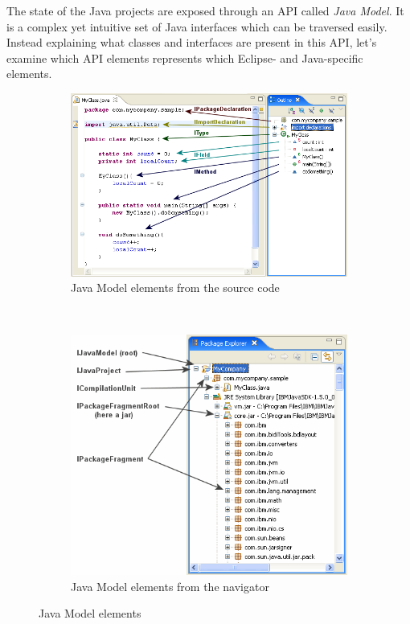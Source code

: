 The state of the Java projects are exposed through an API called \emph{Java
Model}. It is a complex yet intuitive set of Java interfaces which can be
traversed easily. Instead explaining what classes and interfaces are present in
this API, let's examine which API elements represents which Eclipse- and
Java-specific elements.
\begin{figure} 
        \centering
        \begin{subfigure}[b]{0.5\textwidth}
                \centering
                \includegraphics[width=\textwidth]{figures/javamodel2.png}
                \caption{Java Model elements from the source code}
                \label{fig:javamodel2.png}
        \end{subfigure}~
        \begin{subfigure}[b]{0.5\textwidth}
                \centering
                \includegraphics[width=\textwidth]{figures/javamodel1.png}
                \caption{Java Model elements from the navigator}
                \label{fig:javamodel1.png}
        \end{subfigure}
        \caption{Java Model elements}\label{fig:javamodel}
\end{figure}

